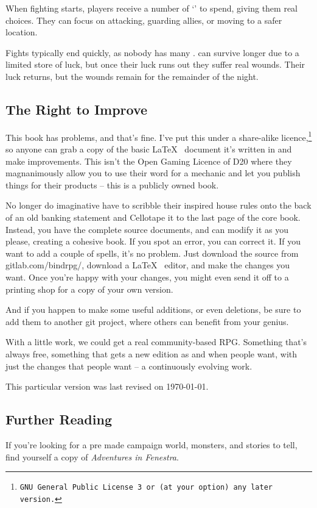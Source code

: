 \begin{multicols}{2}
When fighting starts, players receive a number of `' to spend, giving them real choices.
They can focus on attacking, guarding allies, or moving to a safer location.

Fights typically end quickly, as nobody has many .
 can survive longer due to a limited store of luck, but once their luck runs out they suffer real wounds.
Their luck returns, but the wounds remain for the remainder of the night.

\subsection*{The Right to Improve}

\noindent
This book has problems, and that's fine.
I've put this under a share-alike licence,\footnote{\tt GNU General Public License 3 or (at your option) any later version.} so anyone can grab a copy of the basic \LaTeX~ document it's written in and make improvements.
This isn't the Open Gaming Licence of D20 where they magnanimously allow you to use their word for a mechanic and let you publish things for their products -- this is a publicly owned book.

No longer do imaginative  have to scribble their inspired house rules onto the back of an old banking statement and Cellotape it to the last page of the core book.
Instead, you have the complete source documents, and can modify it as you please, creating a cohesive book.
If you spot an error, you can correct it.
If you want to add a couple of spells, it's no problem.
Just download the source from gitlab.com/bindrpg/, download a \LaTeX~ editor, and make the changes you want.
Once you're happy with your changes, you might even send it off to a printing shop for a copy of your own version.

And if you happen to make some useful additions, or even deletions, be sure to add them to another git project, where others can benefit from your genius.

With a little work, we could get a real community-based RPG.
Something that's always free, something that gets a new edition as and when people want, with just the changes that people want -- a continuously evolving work.

This particular version was last revised on \today.

\subsection*{Further Reading}

If you're looking for a pre made campaign world, monsters, and stories to tell, find yourself a copy of \textit{Adventures in Fenestra}.

\end{multicols}


